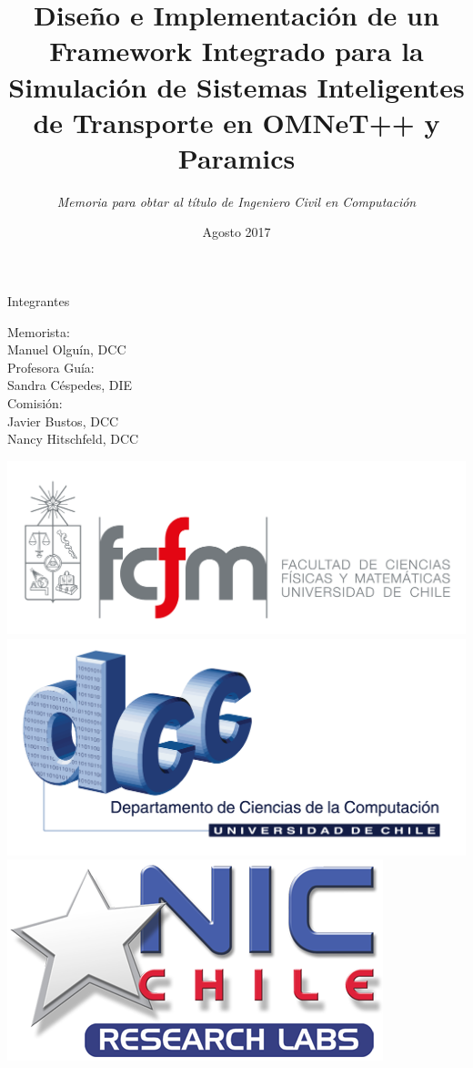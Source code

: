\documentclass[aspectratio=169]{beamer}
\title{Diseño e Implementación de un Framework Integrado para la Simulación de Sistemas Inteligentes de Transporte en OMNeT++ y Paramics}
\subtitle{\emph{Memoria para obtar al título de Ingeniero Civil en Computación}}
\date{Agosto 2017}
\author[Olguín]{\texorpdfstring{%
        \begin{minipage}{.5\textwidth}
            Memorista: \\
            Manuel Olguín \\
            \href{mailto:molguin@dcc.uchile.cl}{\nolinkurl{molguin@dcc.uchile.cl}} \\
        \end{minipage}%
        \begin{minipage}{.5\textwidth}
            Profesora Guía: \\
            Sandra Céspedes \\
            \href{mailto:scespedes@ing.uchile.cl}{\nolinkurl{scespedes@ing.uchile.cl}} \\
    \end{minipage}}{Manuel Olguín}}
\begin{document}
\maketitle

\begin{frame}{Integrantes}
\begin{minipage}{.5\textwidth}
    Memorista: \\
    Manuel Olguín, DCC\\
    
    Profesora Guía:\\
    Sandra Céspedes, DIE \\
    
    Comisión:\\
    Javier Bustos, DCC \\
    Nancy Hitschfeld, DCC
\end{minipage}%
\begin{minipage}{.5\textwidth}
    \centering
    \includegraphics[height=.25\textheight]{figuras/fcfm_horizontal_png.png}\\
    \vspace{0.05\textheight}
    \includegraphics[height=.25\textheight]{figuras/dcc_antiguo_png.png}\\
    \vspace{0.05\textheight}
    \includegraphics[height=.25\textheight]{figuras/niclabs.png}    
\end{minipage}    
\end{frame}
\end{document}
